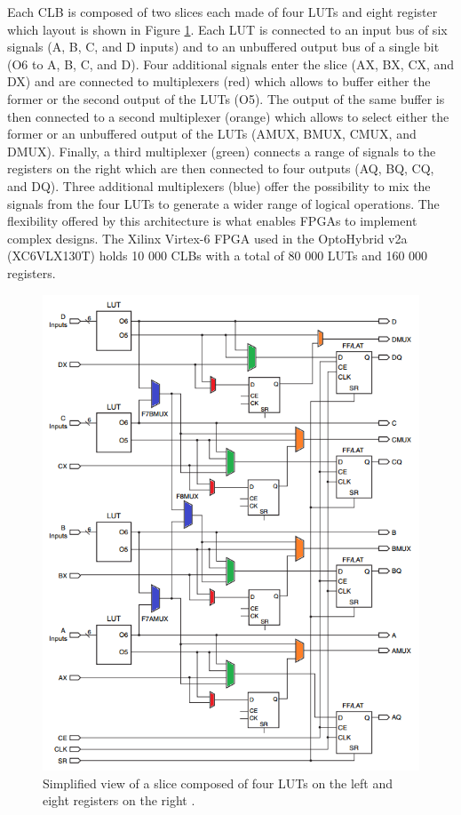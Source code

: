       Each CLB is composed of two slices each made of four LUTs and eight register which layout is shown in Figure \ref{fig:II-6-clb}. Each LUT is connected to an input bus of six signals (A, B, C, and D inputs) and to an unbuffered output bus of a single bit (O6 to A, B, C, and D). Four additional signals enter the slice (AX, BX, CX, and DX) and are connected to multiplexers (red) which allows to buffer either the former or the second output of the LUTs (O5). The output of the same buffer is then connected to a second multiplexer (orange) which allows to select either the former or an unbuffered output of the LUTs (AMUX, BMUX, CMUX, and DMUX). Finally, a third multiplexer (green) connects a range of signals to the registers on the right which are then connected to four outputs (AQ, BQ, CQ, and DQ). Three additional multiplexers (blue) offer the possibility to mix the signals from the four LUTs to generate a wider range of logical operations. The flexibility offered by this architecture is what enables FPGAs to implement complex designs. The Xilinx Virtex-6 FPGA used in the OptoHybrid v2a (XC6VLX130T) holds 10 000 CLBs with a total of 80 000 LUTs and 160 000 registers.

      \begin{figure}[p!]
        \centering
        \includegraphics[width=\textwidth]{img/II-6-irradiation/clb.png}
        \caption{Simplified view of a slice composed of four LUTs on the left and eight registers on the right \cite{VIRTEX-CLB}.}
        \label{fig:II-6-clb}
      \end{figure}

